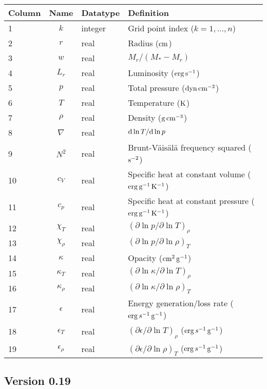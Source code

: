 \documentclass{article}
\newcommand{\diff}{\ensuremath{{\rm d}}}
\newcommand{\Mstar}{\ensuremath{M_{\ast}}}
\newcommand{\cm}{\ensuremath{{\rm cm}}}
\newcommand{\gram}{\ensuremath{{\rm g}}}
\newcommand{\second}{\ensuremath{{\rm s}}}
\newcommand{\dyne}{\ensuremath{{\rm dyn}}}
\newcommand{\erg}{\ensuremath{{\rm erg}}}
\newcommand{\kelvin}{\ensuremath{{\rm K}}}
\begin{document}
\begin{table}[h!]
\begin{tabular}{|l|c|l|l|} \hline
Column & Name & Datatype & Definition \\ \hline
1      & $k$ & integer & Grid point index ($k=1,\ldots,n$) \\
2      & $r$ & real    & Radius ($\cm$) \\
3      & $w$ & real    & $M_{r}/(\Mstar-M_{r})$ \\
4      & $L_{r}$ & real & Luminosity ($\erg\,\second^{-1}$) \\
5      & $p$ & real    & Total pressure ($\dyne\,\cm^{-2}$) \\
6      & $T$ & real    & Temperature ($\kelvin$) \\
7      & $\rho$ & real & Density ($\gram\,\cm^{-3}$) \\
8      & $\nabla$ & real & $\diff \ln T/\diff \ln p$ \\
9      & $N^{2}$ & real & Brunt-V\"ais\"al\"a frequency squared ($\second^{-2}$) \\
10      & $c_{V}$ & real & Specific heat at constant volume ($\erg\,\gram^{-1}\,\kelvin^{-1}$) \\
11     & $c_{p}$ & real & Specific heat at constant pressure ($\erg\,\gram^{-1}\,\kelvin^{-1}$) \\
12     & $\chi_{T}$ & real & $(\partial \ln p/\partial \ln T)_{\rho} $ \\
13     & $\chi_{\rho}$ & real & $(\partial \ln p/\partial \ln \rho)_{T} $ \\
14     & $\kappa$ & real & Opacity ($\cm^{2}\,\gram^{-1}$) \\
15     & $\kappa_{T}$ & real & $(\partial \ln \kappa/\partial \ln T)_{\rho}$ \\
16     & $\kappa_{\rho}$ & real & $(\partial \ln \kappa/\partial \ln \rho)_{T}$ \\
17     & $\epsilon$ & real & Energy generation/loss rate ($\erg\,s^{-1}\,\gram^{-1}$) \\
18     & $\epsilon_{T}$ & real & $(\partial \epsilon/\partial \ln T)_{\rho}$ ($\erg\,s^{-1}\,\gram^{-1}$) \\
19     & $\epsilon_{\rho}$ & real & $(\partial \epsilon/\partial \ln \rho)_{T}$ ($\erg\,s^{-1}\,\gram^{-1}$) \\ \hline
\end{tabular}
\end{table}

\subsection*{Version 0.19}
\end{document}
